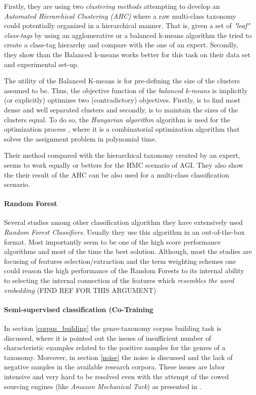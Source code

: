 Firstly, they are using two \textit{clustering methods} attempting to develop an \textit{Automated Hierarchical Clustering (AHC)} where a raw multi-class taxonomy could potentially organized in a hierarchical manner. That is, given a set of  \textit{"leaf" class-tags} by using an agglomerative or a balanced k-means algorithm the tried to create a class-tag hierarchy and compare with the one of an expert. Secondly, they show than the Balanced k-means works better for this task on their data set and experimental set-up.

The utility of the Balanced K-means is for pre-defining the size of the clusters assumed to be. Thus, the objective function of the \textit{balanced k-means} is implicitly (or explicitly) optimizes two (contradictory) objectives. Firstly, is to find most dense and well separated clusters and secondly, is to maintain the sizes of the clusters equal. To do so, the \textit{Hungarian algorithm} algorithm is used for the optimization process \cite{malinen2014balanced}, where it is a combinatorial optimization algorithm that solves the assignment problem in polynomial time.

Their method compared with the hierarchical taxonomy created by an expert, seems to work equally or betters for the HMC scenario of AGI. They also show the their result of the AHC can be also used for  a multi-class classification scenario.

\paragraph{Random Forest} Several studies among other classification algorithm they have extensively used \textit{Random Forest Classifiers}. Usually they use this algorithm in an out-of-the-box format. Most importantly seem to be one of the high score performance algorithms and most of the time the best solution. Although, most the studies are focusing of features selection/extraction and the term weighting schemes one could reason the high performance of the Random Forests to its internal ability to selecting the internal connection of the  features which \textit{resembles the word embedding} (FIND REF FOR THIS ARGUMENT) \parencite{sugiyanto2014term}

\paragraph{Semi-supervised classification (Co-Training} In section \ref{corpus_building} the genre-taxonomy corpus building task is discussed, where it is pointed out the issues of insufficient number of characteristic examples related to the positive samples for the genres of a taxonomy. Moreover, in section \ref{noise} the noise is discussed and the lack of negative samples in the available research corpora. These issues are labor intensive and very hard to be resolved even with the attempt of the cowed sourcing engines (like \textit{Amazon Mechanical Turk}) as presented in \parencite{Asheghi's relative work}. 

